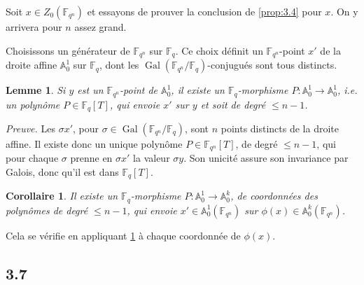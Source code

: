 \documentclass[11pt,a4paper]{article}
\theoremstyle{plain}
\newtheorem{lemma}[theorem]{Lemme}
\newtheorem{corollary}[theorem]{Corollaire}
\theoremstyle{definition}
\DeclareMathOperator{\Gal}{Gal}
\begin{document}
Soit $x \in Z_0(\mathbb{F}_{q^n})$ et essayons de prouver la conclusion de \ref{prop:3.4} pour $x$. On y arrivera pour $n$ assez grand.

Choisissons un g\'en\'erateur de $\mathbb{F}_{q^n}$ sur $\mathbb{F}_q$. Ce choix d\'efinit un $\mathbb{F}_{q^n}$-point $x'$ de la droite affine $\mathbb{A}_0^1$ sur $\mathbb{F}_q$, dont les $\Gal(\mathbb{F}_{q^n}/\mathbb{F}_q)$-conjugu\'es sont tous distincts.

\begin{lemma}\label{lem:3.5}
Si $y$ est un $\mathbb{F}_{q^n}$-point de $\mathbb{A}_0^1$, il existe un $\mathbb{F}_q$-morphisme $P: \mathbb{A}_0^1 \to \mathbb{A}_0^1$, i.e. un polyn\^ome $P \in \mathbb{F}_q[T]$, qui envoie $x'$ sur $y$ et soit de degr\'e $\leq n-1$.
\end{lemma}

\noindent\textit{Preuve.} Les $\sigma x'$, pour $\sigma \in \Gal(\mathbb{F}_{q^n}/\mathbb{F}_q)$, sont $n$ points distincts de la droite affine. Il existe donc un unique polyn\^ome $P \in \mathbb{F}_{q^n}[T]$, de degr\'e $\leq n-1$, qui pour chaque $\sigma$ prenne en $\sigma x'$ la valeur $\sigma y$. Son unicit\'e assure son invariance par Galois, donc qu'il est dans $\mathbb{F}_q[T]$.

\begin{corollary}\label{cor:3.6}
Il existe un $\mathbb{F}_q$-morphisme $P: \mathbb{A}_0^1 \to \mathbb{A}_0^k$, de coordonn\'ees des polyn\^omes de degr\'e $\leq n-1$, qui envoie $x' \in \mathbb{A}_0^1(\mathbb{F}_{q^n})$ sur $\phi(x) \in \mathbb{A}_0^k(\mathbb{F}_{q^n})$.
\end{corollary}

Cela se v\'erifie en appliquant \ref{lem:3.5} \`a chaque coordonn\'ee de $\phi(x)$.

\subsection{3.7}
\end{document}
